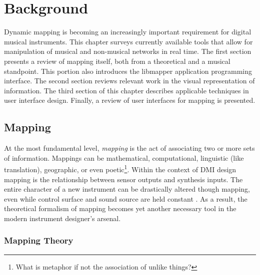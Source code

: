 \chapter{Background}

Dynamic mapping is becoming an increasingly important requirement for digital musical instruments. This chapter surveys currently available tools that allow for manipulation of musical and non-musical networks in real time. The first section presents a review of mapping itself, both from a theoretical and a musical standpoint. This portion also introduces the libmapper application programming interface. The second section reviews relevant work in the visual representation of information. The third section of this chapter describes applicable techniques in user interface design. Finally, a review of user interfaces for mapping is presented.

\section{Mapping}

	At the most fundamental level, \emph{mapping} is the act of associating two or more sets of information. Mappings can be mathematical, computational, linguistic (like translation), geographic, or even poetic\footnote{What is metaphor if not the association of unlike things?}. Within the context of DMI design mapping is the relationship between sensor outputs and synthesis inputs. The entire character of a new instrument can be drastically altered though mapping, even while control surface and sound source are held constant . As a result, the theoretical formalism of mapping becomes yet another necessary tool in the modern instrument designer's arsenal.

	\subsection{Mapping Theory}

